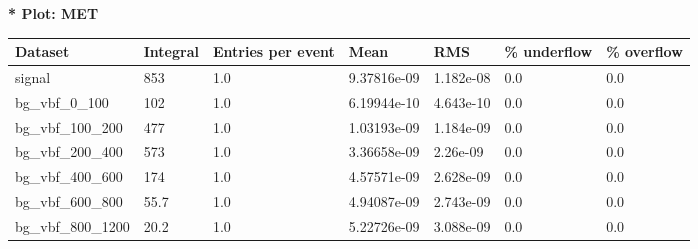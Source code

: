 \documentclass[a4paper, 10pt]{article}
\begin{document}
\textbf{* Plot: MET}\\
   \begin{table}[H]
  \begin{center}
    \begin{tabular}{|m{23.0mm}|m{23.0mm}|m{18.0mm}|m{19.0mm}|m{19.0mm}|m{19.0mm}|m{19.0mm}|}
      \hline
      {\cellcolor{yellow}         Dataset}& {\cellcolor{yellow}         Integral}& {\cellcolor{yellow}         Entries per event}& {\cellcolor{yellow}         Mean}& {\cellcolor{yellow}         RMS}& {\cellcolor{yellow}         \% underflow}& {\cellcolor{yellow}         \% overflow}\\
      \hline
      {\cellcolor{white}         signal}& {\cellcolor{white}         853}& {\cellcolor{white}         1.0}& {\cellcolor{white}         9.37816e-09}& {\cellcolor{white}         1.182e-08}& {\cellcolor{green}         0.0}& {\cellcolor{green}         0.0}\\
      \hline
      {\cellcolor{white}         bg\_vbf\_0\_100}& {\cellcolor{white}         102}& {\cellcolor{white}         1.0}& {\cellcolor{white}         6.19944e-10}& {\cellcolor{white}         4.643e-10}& {\cellcolor{green}         0.0}& {\cellcolor{green}         0.0}\\
      \hline
      {\cellcolor{white}         bg\_vbf\_100\_200}& {\cellcolor{white}         477}& {\cellcolor{white}         1.0}& {\cellcolor{white}         1.03193e-09}& {\cellcolor{white}         1.184e-09}& {\cellcolor{green}         0.0}& {\cellcolor{green}         0.0}\\
      \hline
      {\cellcolor{white}         bg\_vbf\_200\_400}& {\cellcolor{white}         573}& {\cellcolor{white}         1.0}& {\cellcolor{white}         3.36658e-09}& {\cellcolor{white}         2.26e-09}& {\cellcolor{green}         0.0}& {\cellcolor{green}         0.0}\\
      \hline
      {\cellcolor{white}         bg\_vbf\_400\_600}& {\cellcolor{white}         174}& {\cellcolor{white}         1.0}& {\cellcolor{white}         4.57571e-09}& {\cellcolor{white}         2.628e-09}& {\cellcolor{green}         0.0}& {\cellcolor{green}         0.0}\\
      \hline
      {\cellcolor{white}         bg\_vbf\_600\_800}& {\cellcolor{white}         55.7}& {\cellcolor{white}         1.0}& {\cellcolor{white}         4.94087e-09}& {\cellcolor{white}         2.743e-09}& {\cellcolor{green}         0.0}& {\cellcolor{green}         0.0}\\
      \hline
      {\cellcolor{white}         bg\_vbf\_800\_1200}& {\cellcolor{white}         20.2}& {\cellcolor{white}         1.0}& {\cellcolor{white}         5.22726e-09}& {\cellcolor{white}         3.088e-09}& {\cellcolor{green}         0.0}& {\cellcolor{green}         0.0}\\

\end{tabular}
\end{center}
\end{table}
\end{document}
